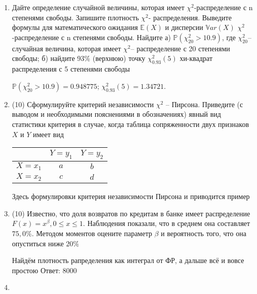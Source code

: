 \documentclass[a4paper,14pt]{article}
\begin{document}
\begin{enumerate}


\item


Дайте определение случайной величины, которая имеет $\chi ^{2}$-распределение с n степенями свободы.
Запишите плотность $\chi ^{2}$- распределения. Выведите формулы для математического ожидания $\mathbb{E}(X)$ и дисперсии $\mathbb{V}ar(X)$ $\chi ^{2}$-распределение с n степенями свободы. Найдите а) $\mathbb{P}(\chi _{20}^{2} > 10.9)$, где $\chi _{20}^{2}$–случайная величина, которая имеет $\chi ^{2}$– распределение с 20 степенями свободы; б) найдите 93\%
(верхнюю) точку $\chi _{0.93}^{2} (5)$ хи-квадрат распределения с 5 степенями свободы




$\mathbb{P}(\chi _{20}^{2} > 10.9) =  0.948775$; $\chi _{0.93}^{2} (5) = 1.34721$.


\item


(10) Сформулируйте критерий независимости $\chi ^ {2}$ – Пирсона. Приведите (с выводом и
необходимыми пояснениями в обозначениях) явный вид статистики критерия в случае, когда 
таблица сопряженности двух признаков $X$ и $Y$ имеет вид

\begin{tabular}[b]{ | c | c | c | }
\hline
$ $ & $Y = y _{1}$ & $Y = y _{2}$  \\ \hline
$X = x _{1}$ & $a$ & $b$ \\ \hline
$X = x _{2}$ & $c$ & $d$ \\
\hline
\end{tabular}




Здесь формулировки критерия независимости Пирсона и приводится пример


\item


(10) Известно, что доля возвратов по кредитам в банке имеет распределение $F(x) = x ^{\beta}, 0 \leqslant x \leqslant 1$.
Наблюдения показали, что в среднем она составляет $75,0\%$. Методом моментов оцените параметр $\beta$ и
вероятность того, что она опуститься ниже $20\%$




Найдём плотность рапределения как интеграл от ФР, а дальше всё и вовсе простою Ответ: $8000$


\item



\end{enumerate}
\end{document}
